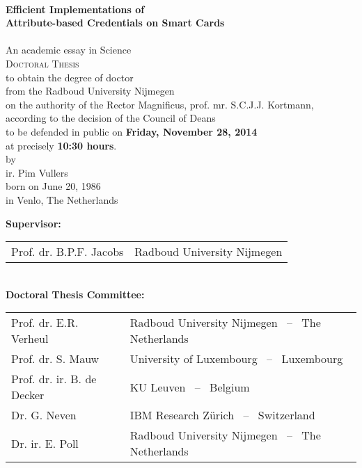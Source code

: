 \thispagestyle{empty}

\begin{center}
  ~ \\[20mm]

  \textbf{\Large Efficient Implementations of\\ Attribute-based Credentials on Smart Cards}\\[15mm]

  ~ \\
  An academic essay in Science \\[15mm]

  \textsc{Doctoral Thesis} \\[15mm]

  to obtain the degree of doctor \\
  from the Radboud University Nijmegen \\
  on the authority of the Rector Magnificus, prof. mr. S.C.J.J. Kortmann, \\
  according to the decision of the Council of Deans \\
  to be defended in public on \textbf{Friday, November 28, 2014} \\
  at precisely \textbf{10:30 hours}. \\[20mm]

  by \\[20mm]

  ir. Pim Vullers \\[15mm]

  born on June 20, 1986 \\
  in Venlo, The Netherlands
\end{center}

\clearpage

\thispagestyle{empty}

\noindent\textbf{Supervisor:} \\[2mm]
\indent\begin{tabular}{p{40mm}l}
  Prof. dr. B.P.F. Jacobs & Radboud University Nijmegen \\
\end{tabular} \\[2mm]

\noindent\textbf{Doctoral Thesis Committee:} \\[2mm]
\indent\begin{tabular}{p{40mm}l}
  Prof. dr. E.R. Verheul     & Radboud University Nijmegen ~--~ The Netherlands \\
  Prof. dr. S. Mauw          & University of Luxembourg ~--~ Luxembourg \\
  Prof. dr. ir. B. de Decker & KU Leuven ~--~ Belgium \\
  Dr. G. Neven               & IBM Research Z\"{u}rich ~--~ Switzerland \\
  Dr. ir. E. Poll            & Radboud University Nijmegen ~--~ The Netherlands \\
\end{tabular}
